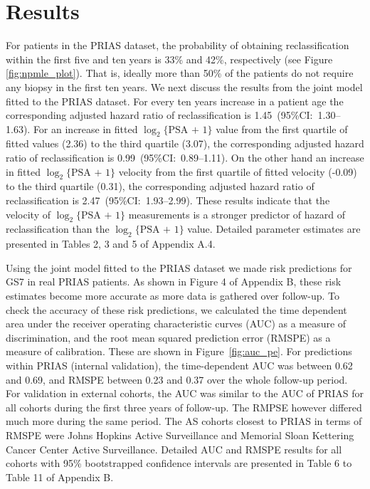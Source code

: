 \section{Results}
For patients in the PRIAS dataset, the probability of obtaining reclassification within the first five and ten years is 33\% and 42\%, respectively (see Figure \ref{fig:npmle_plot}). That is, ideally more than 50\% of the patients do not require any biopsy in the first ten years. We next discuss the results from the joint model fitted to the PRIAS dataset. For every ten years increase in a patient age the corresponding adjusted hazard ratio of reclassification is 1.45~(95\%CI:~1.30--1.63). For an increase in fitted $\log_2\{\mbox{PSA + 1}\}$ value from the first quartile of fitted values (2.36) to the third quartile (3.07), the corresponding adjusted hazard ratio of reclassification is 0.99~(95\%CI:~0.89--1.11). On the other hand an increase in fitted $\log_2\{\mbox{PSA + 1}\}$ velocity from the first quartile of fitted velocity (-0.09) to the third quartile (0.31), the corresponding adjusted hazard ratio of reclassification is 2.47~(95\%CI:~1.93--2.99). These results indicate that the velocity of $\log_2\{\mbox{PSA + 1}\}$ measurements is a stronger predictor of hazard of reclassification than the $\log_2\{\mbox{PSA + 1}\}$ value. Detailed parameter estimates are presented in Tables 2, 3 and 5 of Appendix A.4.

Using the joint model fitted to the PRIAS dataset we made risk predictions for GS7 in real PRIAS patients. As shown in Figure 4 of Appendix B, these risk estimates become more accurate as more data is gathered over follow-up. To check the accuracy of these risk predictions, we calculated the time dependent area under the receiver operating characteristic curves (AUC) as a measure of discrimination, and the root mean squared prediction error (RMSPE) as a measure of calibration. These are shown in Figure~\ref{fig:auc_pe}. For predictions within PRIAS (internal validation), the time-dependent AUC was between 0.62 and 0.69, and RMSPE between 0.23 and 0.37 over the whole follow-up period. For validation in external cohorts, the AUC was similar to the AUC of PRIAS for all cohorts during the first three years of follow-up. The RMPSE however differed much more during the same period. The AS cohorts closest to PRIAS in terms of RMSPE were Johns Hopkins Active Surveillance and Memorial Sloan Kettering Cancer Center Active Surveillance. Detailed AUC and RMSPE results for all cohorts with 95\% bootstrapped confidence intervals are presented in Table 6 to Table 11 of Appendix B.

